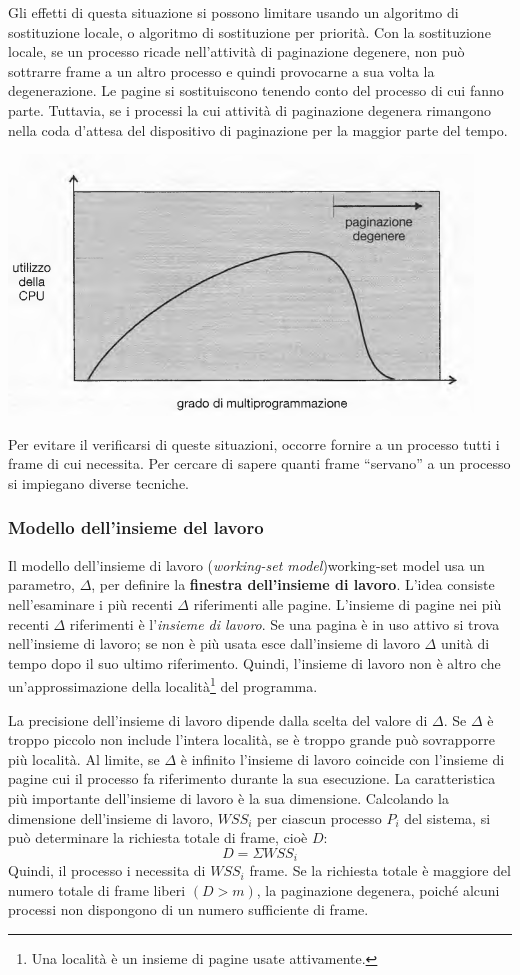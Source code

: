 \documentclass[11pt,a4paper]{article}
\begin{document}
{Gli effetti di questa situazione si possono limitare usando un algoritmo di sostituzio­ne locale, o algoritmo di sostituzione per priorità. Con la sostituzione locale, se un proces­so ricade nell'attività di paginazione degenere, non può sottrarre frame a un altro processo e
quindi provocarne a sua volta la degenerazione. Le pagine si sostituiscono tenendo conto del
processo di cui fanno parte. Tuttavia, se i processi la cui attività di paginazione degenera ri­mangono nella coda d'attesa del dispositivo di paginazione per la maggior parte del tempo.
\begin{center}
  \includegraphics[scale=0.6]{img/0051.png}
\end{center}
Per evitare il verificarsi di queste situazioni, occorre fornire a un processo tutti i frame di cui
necessita. Per cercare di sapere quanti frame “servano” a un processo si impiegano diverse
tecniche.

\subsubsection{Modello dell'insieme del lavoro}
Il modello dell'insieme di lavoro (\emph{working-set model})working-set model usa un parametro, $\Delta$, per definire la \textbf{finestra dell'insieme di lavoro}. L'idea consiste nell'esaminare i più recenti $\Delta$ riferimenti alle pagine. L'insieme di pa­gine nei più recenti $\Delta$ riferimenti è l'\emph{insieme di lavoro}. Se una pagina è in uso attivo si trova nell'insieme di lavoro; se non è più usata esce dal­l'insieme di lavoro $\Delta$ unità di tempo dopo il suo ultimo riferimento. Quindi, l'insieme di la­voro non è altro che un'approssimazione della località\footnote{Una località è un insieme di pagine usate attivamente.} del programma.

La precisione dell'insieme di lavoro dipende dalla scelta del valore di $\Delta$. Se $\Delta$ è troppo
piccolo non include l'intera località, se è troppo grande può sovrapporre più località. Al li­mite, se $\Delta$ è infinito l'insieme di lavoro coincide con l'insieme di pagine cui il processo fa ri­ferimento durante la sua esecuzione.
La caratteristica più importante dell'insieme di lavoro è la sua dimensione. Calcolan­do la dimensione dell'insieme di lavoro, $WSS_i$ per ciascun processo $P_i$ del sistema, si può de­terminare la richiesta totale di frame, cioè $D$:
\[D= \Sigma WSS_i \]
Quindi, il processo i
necessita di $WSS_i$ frame. Se la richiesta totale è maggiore del numero totale di frame liberi
$(D > m)$, la paginazione degenera, poiché alcuni processi non dispongono di un numero suf­ficiente di frame.

}
\end{document}
